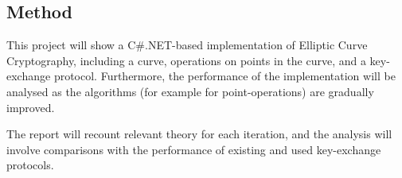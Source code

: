 \subsection{Method}

This project will show a C\#.NET-based implementation of Elliptic Curve Cryptography, including a curve, operations on points in the curve, and a key-exchange protocol. Furthermore, the performance of the implementation will be analysed as the algorithms (for example for point-operations) are gradually improved.

The report will recount relevant theory for each iteration, and the analysis will involve comparisons with the performance of existing and used key-exchange protocols.